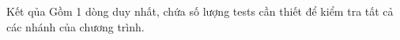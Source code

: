 Kết qủa
Gồm 1 dòng duy nhất, chứa số lượng tests cần thiết để kiểm tra tất cả các nhánh của chương trình.